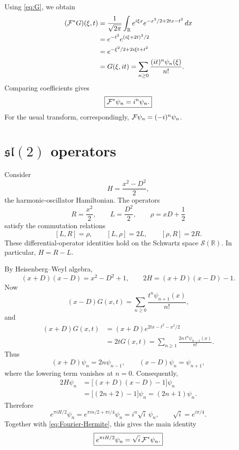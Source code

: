 \documentclass[11pt]{amsart}
\newcommand{\RR}{\mathbb R}
\newcommand{\F}{{\cal F}}
\newcommand{\Fstar}{{\cal F}^{*}}
\newcommand{\dd}{\,dx}
\begin{document}
Using \eqref{eq:G}, we obtain
\begin{align}
(\Fstar G)(\xi,t)
&=\frac1{\sqrt{2\pi}}\int_{\RR}
e^{i\xi x}e^{-x^2/2+2tx-t^2}\dd\notag\\
&=e^{-t^2}e^{(i\xi+2t)^2/2}\notag\\
&=e^{-\xi^2/2+2i\xi t+t^2}\label{eq:corrected-mixed-term}\\
&=G(\xi,it)
=\sum_{n\ge0}\frac{(it)^n\psi_n(\xi)}{n!}.\notag
\end{align}
Comparing coefficients gives
\begin{equation}\label{eq:Fourier-Hermite}
\boxed{\Fstar\psi_n=i^n\psi_n.}
\end{equation}
For the usual transform, correspondingly,
$\F\psi_n=(-i)^n\psi_n$.

\section{$\mathfrak{sl}(2)$ operators}
Consider
\[
H=\frac{x^2-D^2}{2},
\]
the harmonic-oscillator Hamiltonian. The operators
\[
R=\frac{x^2}{2},\qquad L=\frac{D^2}{2},\qquad
\rho=xD+\frac12
\]
satisfy the commutation relations
\begin{equation}\label{eq:commutators}
[L,R]=\rho,\qquad [L,\rho]=2L,\qquad [\rho,R]=2R.
\end{equation}
These differential-operator identities hold on the Schwartz space
$\mathcal S(\RR)$. In particular, $H=R-L$.

By Heisenberg--Weyl algebra,
\[
(x+D)(x-D)=x^2-D^2+1,
\qquad 2H=(x+D)(x-D)-1.
\]
Now
\[
(x-D)G(x,t)=\sum_{n\ge0}\frac{t^n\psi_{n+1}(x)}{n!},
\]
and
\begin{align*}
(x+D)G(x,t)
&=(x+D)e^{2tx-t^2-x^2/2}\\
&=2tG(x,t)
=\sum_{n\ge1}\frac{2n\,t^n\psi_{n-1}(x)}{n!}.
\end{align*}
Thus
\[
(x+D)\psi_n=2n\psi_{n-1},\qquad
(x-D)\psi_n=\psi_{n+1},
\]
where the lowering term vanishes at $n=0$. Consequently,
\begin{align*}
2H\psi_n
&=\bigl[(x+D)(x-D)-1\bigr]\psi_n\\
&=\bigl[(2n+2)-1\bigr]\psi_n
=(2n+1)\psi_n.
\end{align*}
Therefore
\[
e^{\pi iH/2}\psi_n
=e^{\pi in/2+\pi i/4}\psi_n
=i^n\sqrt{i}\,\psi_n,
\qquad \sqrt{i}=e^{i\pi/4}.
\]
Together with \eqref{eq:Fourier-Hermite}, this gives the main identity
\begin{equation}\label{eq:main-on-basis}
\boxed{e^{\pi iH/2}\psi_n=\sqrt{i}\,\Fstar\psi_n.}
\end{equation}
\end{document}
